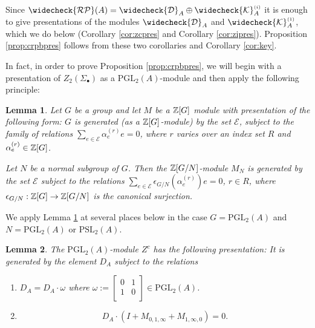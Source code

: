 \documentclass[12pt]{amsart}
\newtheorem{lem}{Lemma}[section]
\theoremstyle{definition}
\newcommand{\Z}{\Bbb{Z}}
\newcommand{\K}{\mathcal{K}}
\newcommand{\pspl}[2]{\mathrm{PSL}_{#1}(#2)}
\newcommand{\pgl}[2]{\mathrm{PGL}_{#1}(#2)}
\newcommand{\crpb}[1]{\widecheck{\mathcal{RP}}(#1)}
\newcommand{\cks}[2]{\widecheck{{\K}}^{\mbox{\tiny $(#1)$}}_{#2}}
\newcommand{\cconst}[1]{D_{#1}}
\newcommand{\ccconstmod}[1]{\widecheck{\mathcal{D}}_{#1}}
\newcommand{\<}{\langle}
\renewcommand{\>}{\rangle}
\newcommand{\an}[1]{\left\langle{#1}\right\rangle}
\begin{document}
Since $\crpb{A}=\ccconstmod{A}\oplus \cks{i}{A}$ it is enough to give presentations of the modules $\ccconstmod{A}$ and $\cks{1}{A}$, which we do below (Corollary \ref{cor:zcpres} and 
Corollary \ref{cor:zipres}). Proposition \ref{prop:crpbpres} follows from these two corollaries and Corollary \ref{cor:key}.



In fact, in order to prove Proposition \ref{prop:crpbpres}, we will begin with a presentation of $Z_2(\Sigma_\bullet)$ as a $\pgl{2}{A}$-module and then  apply the following 
principle:

\begin{lem}\label{lem:presprin} Let $G$ be a group and let $M$ be a $\Z[G]$ module with presentation of the following form: $G$ is generated (as a $\Z[G]$-module) by the set $\mathcal{E}$, subject to the family of relations $\sum_{e\in\mathcal{E}}\alpha^{(r)}_e e=0$, where $r$ varies over an index set $R$ and $\alpha^{(r)}_e\in \Z[G]$. 

Let $N$ be a normal subgroup of $G$. Then the $\Z[G/N]$-module $M_N$ is generated by the set $\mathcal{E}$ subject to the relations $\sum_{e\in\mathcal{E}}\epsilon_{G/N}(\alpha^{(r)}_e)e=0$, $r\in R$, where $\epsilon_{G/N}:\Z[G]\to \Z[G/N]$ is the canonical surjection.
\end{lem}

We apply Lemma \ref{lem:presprin} at several places below in the case $G=\pgl{2}{A}$ and $N=\pgl{2}{A}$ or $\pspl{2}{A}$.

 


\begin{lem}\label{lem:zcpres} The $\pgl{2}{A}$-module $Z^c$ has the following presentation: It is generated by the element $\cconst{A}$ subject to the relations
\begin{enumerate}
\item  
 $\cconst{A}=\cconst{A}\cdot \omega$ where  $\omega:=
\left[
\begin{array}{cc}
0&1\\
1&0\\
\end{array}
\right]\in \pgl{2}{A}$.

\item 
\[\cconst{A}\cdot \left( I+M_{0,1,\infty}+M_{1,\infty,0}\right)=0.
\]
\end{enumerate}

\end{lem}
\end{document}
